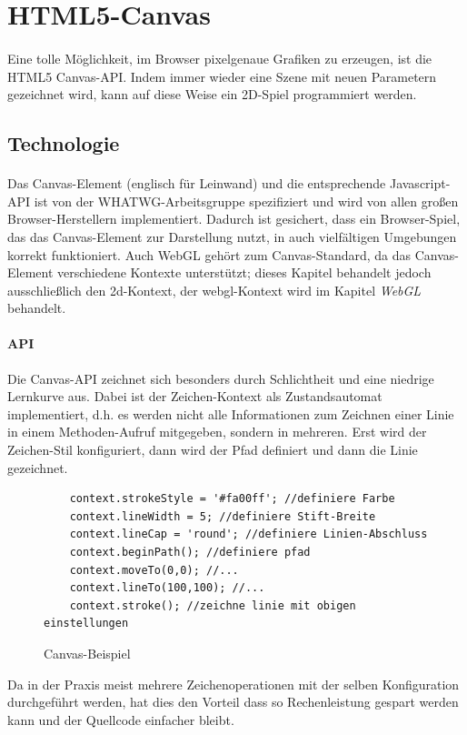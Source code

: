 \documentclass[a4paper, 12pt]{article}
\begin{document}
\section{HTML5-Canvas}
\paragraph{} Eine tolle Möglichkeit, im Browser pixelgenaue Grafiken zu erzeugen, ist die HTML5 Canvas-API. Indem immer wieder eine Szene mit neuen Parametern gezeichnet wird, kann auf diese Weise ein 2D-Spiel programmiert werden.
\subsection{Technologie}
\paragraph{} Das Canvas-Element (englisch für Leinwand) und die entsprechende Javascript-API ist von der WHATWG-Arbeitsgruppe spezifiziert und wird von allen großen Browser-Herstellern implementiert. Dadurch ist gesichert, dass ein Browser-Spiel, das das Canvas-Element zur Darstellung nutzt, in auch vielfältigen  Umgebungen korrekt funktioniert. Auch WebGL gehört zum Canvas-Standard, da das Canvas-Element verschiedene Kontexte unterstützt; dieses Kapitel behandelt jedoch ausschließlich den \glqq 2d\grqq-Kontext, der \glqq webgl\grqq-Kontext wird im Kapitel \emph{WebGL} behandelt.
\paragraph{API} Die Canvas-API zeichnet sich besonders durch Schlichtheit und eine niedrige Lernkurve aus. Dabei ist der Zeichen-Kontext als Zustandsautomat implementiert, d.h. es werden nicht alle Informationen zum Zeichnen einer Linie in einem Methoden-Aufruf mitgegeben, sondern in mehreren. Erst wird der Zeichen-Stil konfiguriert, dann wird der Pfad definiert und dann die Linie gezeichnet.
\begin{figure}[h!]
	\begin{verbatim}
	context.strokeStyle = '#fa00ff'; //definiere Farbe
	context.lineWidth = 5; //definiere Stift-Breite
	context.lineCap = 'round'; //definiere Linien-Abschluss
	context.beginPath(); //definiere pfad
	context.moveTo(0,0); //...
	context.lineTo(100,100); //...
	context.stroke(); //zeichne linie mit obigen einstellungen
	\end{verbatim}
	\caption{Canvas-Beispiel}
	\label{canvas-example}
\end{figure}
Da in der Praxis meist mehrere Zeichenoperationen mit der selben Konfiguration durchgeführt werden, hat dies den Vorteil dass so Rechenleistung gespart werden kann und der Quellcode einfacher bleibt.
\end{document}
